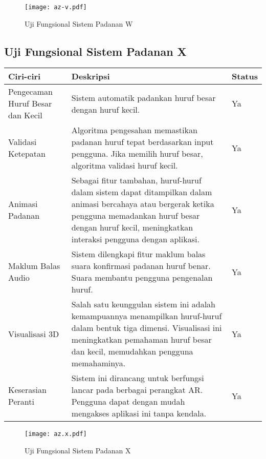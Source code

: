 \begin{itemize}
\begin{itemize}
\begin{itemize}
\begin{itemize}
\begin{itemize}
\begin{itemize}
\begin{itemize}
\begin{itemize}
\begin{flushleft}
\begin{figure}
    \centering
    \texttt{[image: az-v.pdf]}
    \caption{Uji Fungsional  Sistem Padanan W }
    \label{fig:az-s.pdf}

    
\end{figure}

\subsection{Uji Fungsional  Sistem Padanan X}

\begin{tabular}{>{\raggedright}p{3cm}p{9cm}>{\centering\arraybackslash}p{2cm}}
\toprule
\textbf{Ciri-ciri} & \textbf{Deskripsi} & \textbf{Status} \\
\midrule
Pengecaman Huruf Besar dan Kecil & Sistem automatik padankan huruf besar dengan huruf kecil. & Ya \\

Validasi Ketepatan & Algoritma pengesahan memastikan padanan huruf tepat berdasarkan input pengguna. Jika memilih huruf besar, algoritma validasi huruf kecil. & Ya \\

Animasi Padanan & Sebagai fitur tambahan, huruf-huruf dalam sistem dapat ditampilkan dalam animasi bercahaya atau bergerak ketika pengguna memadankan huruf besar dengan huruf kecil, meningkatkan interaksi pengguna dengan aplikasi. & Ya \\

Maklum Balas Audio & Sistem dilengkapi fitur maklum balas suara konfirmasi padanan huruf benar. Suara membantu pengguna pengenalan huruf. & Ya \\

Visualisasi 3D & Salah satu keunggulan sistem ini adalah kemampuannya menampilkan huruf-huruf dalam bentuk tiga dimensi. Visualisasi ini meningkatkan pemahaman huruf besar dan kecil, memudahkan pengguna memahaminya. & Ya \\

Keserasian Peranti & Sistem ini dirancang untuk berfungsi lancar pada berbagai perangkat AR. Pengguna dapat dengan mudah mengakses aplikasi ini tanpa kendala. & Ya \\
\bottomrule
\end{tabular}

\begin{figure}
    \centering
    \texttt{[image: az.x.pdf]}
    \caption{Uji Fungsional  Sistem Padanan X}
    \label{fig:az-s.pdf}


\end{figure}
\end{flushleft}
\end{itemize}
\end{itemize}
\end{itemize}
\end{itemize}
\end{itemize}
\end{itemize}
\end{itemize}
\end{itemize}

